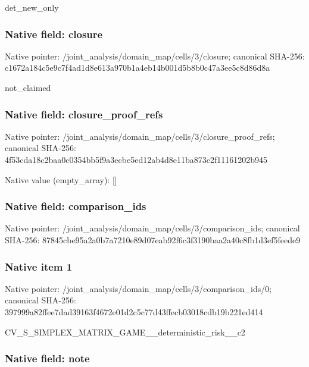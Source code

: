 \documentclass[10pt,a4paper]{article}
\begin{document}
det\_new\_only


\subsubsection{Native field: closure}


Native pointer: /joint\_analysis/domain\_m\allowbreak{}ap/cells/3/closure; canonical SHA-256: c1672a184c5e9c7f4ad1d8e6\allowbreak{}13a970b1a4eb14b001d5b8b0\allowbreak{}c47a3ee5c8d86d8a


not\_claimed


\subsubsection{Native field: closure\_proof\_refs}


Native pointer: /joint\_analysis/domain\_m\allowbreak{}ap/cells/3/closure\_proof\allowbreak{}\_refs; canonical SHA-256: 4f53cda18c2baa0c0354bb5f\allowbreak{}9a3ecbe5ed12ab4d8e11ba87\allowbreak{}3c2f11161202b945



Native value (empty\_array): []



\subsubsection{Native field: comparison\_ids}


Native pointer: /joint\_analysis/domain\_m\allowbreak{}ap/cells/3/comparison\_id\allowbreak{}s; canonical SHA-256: 87845cbe95a2a0b7a7210e89\allowbreak{}d07eab92f6c3f3190baa2a40\allowbreak{}c8fb1d3ef5feede9



\subsubsection{Native item 1}


Native pointer: /joint\_analysis/domain\_m\allowbreak{}ap/cells/3/comparison\_id\allowbreak{}s/0; canonical SHA-256: 397999a82ffee7dad39163f4\allowbreak{}672e01d2c5c77d43ffecb030\allowbreak{}18cdb19b221ed414


CV\_S\_SIMPLEX\_MATRIX\_GAME\allowbreak{}\_\_deterministic\_risk\_\_c2


\subsubsection{Native field: note}
\end{document}
